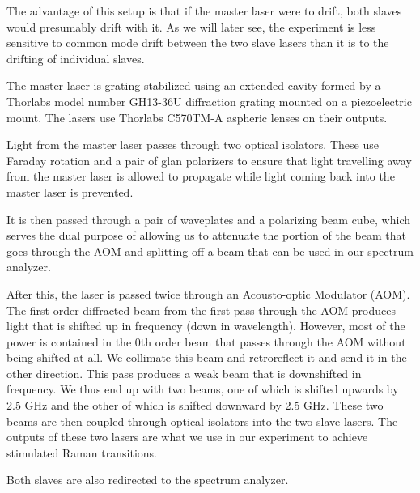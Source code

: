 The advantage of this setup is that if the master laser were to drift, both slaves would presumably drift with it. As we will later see, the experiment is less sensitive to common mode drift between the two slave lasers than it is to the drifting of individual slaves.

The master laser is grating stabilized using an extended cavity formed by a Thorlabs model number GH13-36U  %
diffraction grating mounted on a piezoelectric mount. The lasers use Thorlabs C570TM-A aspheric lenses on their outputs. 

Light from the master laser passes through two optical isolators. These use Faraday rotation and a pair of glan polarizers to ensure that light travelling away from the master laser is allowed to propagate while light coming back into the master laser is prevented. 

It is then passed through a pair of waveplates and a polarizing beam cube, which serves the dual purpose of allowing us to attenuate the portion of the beam that goes through the AOM and splitting off a beam that can be used in our spectrum analyzer. 

After this, the laser is passed twice through an Acousto-optic Modulator (AOM). The first-order diffracted beam from the first pass through the AOM produces light that is shifted up in frequency (down in wavelength). However, most of the power is contained in the 0th order beam that passes through the AOM without being shifted at all. We collimate this beam and retroreflect it and send it in the other direction. This pass produces a weak beam that is downshifted in frequency. We thus end up with two beams, one of which is shifted upwards by 2.5 GHz and the other of which is shifted downward by 2.5 GHz. These two beams are then coupled through optical isolators into the two slave lasers. The outputs of these two lasers are what we use in our experiment to achieve stimulated Raman transitions. 


Both slaves are also redirected to the spectrum analyzer. 

